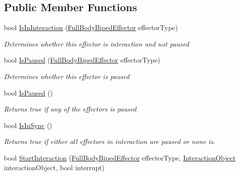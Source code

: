 \subsection*{Public Member Functions}
\begin{DoxyCompactItemize}
\item 
bool \mbox{\hyperlink{class_root_motion_1_1_final_i_k_1_1_interaction_system_a27dd4f8a87aa6532d1c26eb562e4b149}{Is\+In\+Interaction}} (\mbox{\hyperlink{namespace_root_motion_1_1_final_i_k_ae0dd2058c7667b6f132c11a6b860c14a}{Full\+Body\+Biped\+Effector}} effector\+Type)
\begin{DoxyCompactList}\small\item\em Determines whether this effector is interaction and not paused \end{DoxyCompactList}\item 
bool \mbox{\hyperlink{class_root_motion_1_1_final_i_k_1_1_interaction_system_a458320440713a540dda0babc58c754a9}{Is\+Paused}} (\mbox{\hyperlink{namespace_root_motion_1_1_final_i_k_ae0dd2058c7667b6f132c11a6b860c14a}{Full\+Body\+Biped\+Effector}} effector\+Type)
\begin{DoxyCompactList}\small\item\em Determines whether this effector is paused \end{DoxyCompactList}\item 
bool \mbox{\hyperlink{class_root_motion_1_1_final_i_k_1_1_interaction_system_ac0f0794aa4784bf6ff2a7b6adc9159b7}{Is\+Paused}} ()
\begin{DoxyCompactList}\small\item\em Returns true if any of the effectors is paused \end{DoxyCompactList}\item 
bool \mbox{\hyperlink{class_root_motion_1_1_final_i_k_1_1_interaction_system_aaa06cd44fe10d5ead7a8a5db3e4cabdd}{Is\+In\+Sync}} ()
\begin{DoxyCompactList}\small\item\em Returns true if either all effectors in interaction are paused or none is. \end{DoxyCompactList}\item 
bool \mbox{\hyperlink{class_root_motion_1_1_final_i_k_1_1_interaction_system_a36b936a890fd028803110b47cf40b90c}{Start\+Interaction}} (\mbox{\hyperlink{namespace_root_motion_1_1_final_i_k_ae0dd2058c7667b6f132c11a6b860c14a}{Full\+Body\+Biped\+Effector}} effector\+Type, \mbox{\hyperlink{class_root_motion_1_1_final_i_k_1_1_interaction_object}{Interaction\+Object}} interaction\+Object, bool interrupt)

\end{DoxyCompactItemize}
